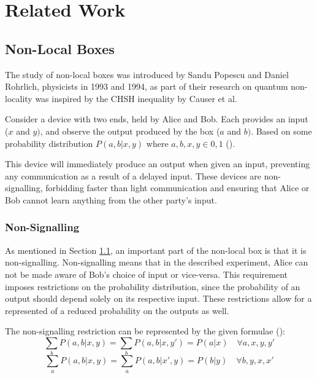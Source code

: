 \documentclass[report.tex]{subfiles}
\begin{document}
\chapter{Related Work} %
\label{cha:related_work}


\section{Non-Local Boxes} %
\label{sec:non_local_boxes}
The study of non-local boxes was introduced by Sandu Popescu and Daniel
Rohrlich, physicists in 1993 and 1994, as part of their research on quantum
non-locality was inspired by the CHSH inequality by Causer et al.

Consider a device with two ends, held by Alice and Bob. Each provides an
input (\(x\) and \(y)\), and observe the output produced by the box (\(a\) and
\(b)\). Based on some probability distribution \(P(a,b | x,y)\) where \(a, b, x,
y \in {0, 1}\) (\cite[Definition~1]{nlb_lamontagne}). 

This device will immediately produce an output when given an input, preventing
any communication as a result of a delayed input. These devices are
non-signalling, forbidding faster than light communication and ensuring that
Alice or Bob cannot learn anything from the other party's input.

\subsection{Non-Signalling} %
\label{sub:non_signalling}
As mentioned in Section \ref{sec:non_local_boxes}, an important part of the
non-local box is that it is non-signalling. Non-signalling means that in the
described experiment, Alice can not be made aware of Bob's choice of input or
vice-versa. This requirement imposes restrictions on the probability
distribution, since the probability of an output should depend solely on its
respective input. These restrictions allow for a represented of a reduced
probability on the outputs as well.

The non-signalling restriction can be represented by the given formulae
(\cite[Section~II.A]{PhysRevA.71.022101}):
\[\sum_{b} P(a, b | x, y) = \sum_{b} P(a, b | x, y') = P(a | x) 
\quad \forall a, x, y, y'\]
\[\sum_{a} P(a, b | x, y) = \sum_{a} P(a, b | x', y) = P(b | y) 
\quad \forall b, y, x, x'\]
\end{document}

